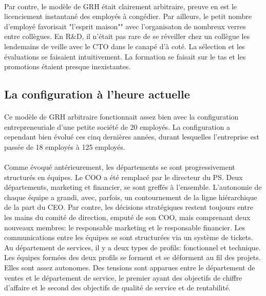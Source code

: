 \paragraph{}Par contre, le modèle de GRH était clairement arbitraire\citep[pp. 115-119]{pichault}, preuve en est le licenciement instantané des employés à congédier. Par ailleurs, le petit nombre d'employé favorisait "l'esprit maison"" avec l'organisaton de nombreux verres entre collègues. En R\&D, il n'était pas rare de se réveiller chez un collègue les lendemains de veille avec le CTO dans le canapé d'à coté. La sélection et les évaluations se faisaient intuitivement.  La formation se faisait sur le tas et les promotions étaient presque inexistantes. 

\subsection{La configuration à l'heure actuelle}
\paragraph{} Ce modèle de GRH arbitraire fonctionnait assez bien avec la configuration entrepreneuriale d'une petite société de 20 employés. La configuration a cependant bien évolué ces cinq dernières années, durant lesquelles l'entreprise est passée de 18 employés à 125 employés. 

\paragraph{} Comme évoqué antérieurement, les départements se sont progressivement structurés en équipes. Le COO a été remplacé par le directeur du PS. Deux départements, marketing et financier, se sont greffés à l'ensemble. L'autonomie de chaque équipe a grandi, avec, parfois, un contournement de la ligne hiérarchique de la part du CEO. Par contre, les décisions stratégiques restent toujours entre les mains du comité de direction, emputé de son COO, mais comprenant deux nouveaux membres: le responsable marketing et le responsable financier. Les communications entre les équipes se sont structurées via un système de tickets. Au département de services, il y a deux types de profils: fonctionnel et technique. Les équipes formées des deux profils se forment et se déforment au fil des projets. Elles sont assez autonomes. Des tensions sont apparues entre le département de ventes et le département de service, le premier ayant des objectifs de chiffre d'affaire et le second des objectifs de qualité de service et de rentabilité.

